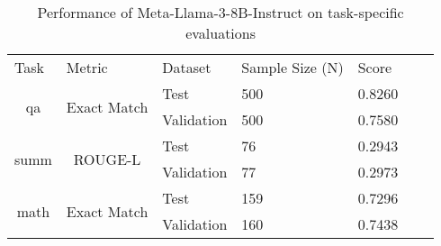 \begin{table}[H]
\centering
\caption{Performance of Meta-Llama-3-8B-Instruct on task-specific evaluations}
\begin{tabular}{lllllll}
\cline{1-5}
\multicolumn{1}{|l|}{Task}                  & \multicolumn{1}{l|}{Metric}                       & \multicolumn{1}{l|}{Dataset}    & \multicolumn{1}{l|}{Sample Size (N)} & \multicolumn{1}{l|}{Score}  &  &  \\ \cline{1-5}
\multicolumn{1}{|c|}{\multirow{2}{*}{qa}}   & \multicolumn{1}{c|}{\multirow{2}{*}{Exact Match}} & \multicolumn{1}{l|}{Test}       & \multicolumn{1}{l|}{500}             & \multicolumn{1}{l|}{0.8260} &  &  \\ \cline{3-5}
\multicolumn{1}{|c|}{}                      & \multicolumn{1}{c|}{}                             & \multicolumn{1}{l|}{Validation} & \multicolumn{1}{l|}{500}             & \multicolumn{1}{l|}{0.7580} &  &  \\ \cline{1-5}
\multicolumn{1}{|c|}{\multirow{2}{*}{summ}} & \multicolumn{1}{c|}{\multirow{2}{*}{ROUGE-L}}     & \multicolumn{1}{l|}{Test}       & \multicolumn{1}{l|}{76}              & \multicolumn{1}{l|}{0.2943} &  &  \\ \cline{3-5}
\multicolumn{1}{|c|}{}                      & \multicolumn{1}{c|}{}                             & \multicolumn{1}{l|}{Validation} & \multicolumn{1}{l|}{77}              & \multicolumn{1}{l|}{0.2973} &  &  \\ \cline{1-5}
\multicolumn{1}{|c|}{\multirow{2}{*}{math}} & \multicolumn{1}{c|}{\multirow{2}{*}{Exact Match}} & \multicolumn{1}{l|}{Test}       & \multicolumn{1}{l|}{159}             & \multicolumn{1}{l|}{0.7296} &  &  \\ \cline{3-5}
\multicolumn{1}{|c|}{}                      & \multicolumn{1}{c|}{}                             & \multicolumn{1}{l|}{Validation} & \multicolumn{1}{l|}{160}             & \multicolumn{1}{l|}{0.7438} &  &  \\ \cline{1-5}
\end{tabular}
\label{tab:TraceTaskEvalPreEval}
\end{table}
